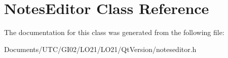 \hypertarget{class_notes_editor}{}\section{Notes\+Editor Class Reference}
\label{class_notes_editor}


The documentation for this class was generated from the following file\+:\begin{DoxyCompactItemize}
\item 
Documents/\+U\+T\+C/\+G\+I02/\+L\+O21/\+L\+O21/\+Qt\+Version/noteseditor.\+h\end{DoxyCompactItemize}

